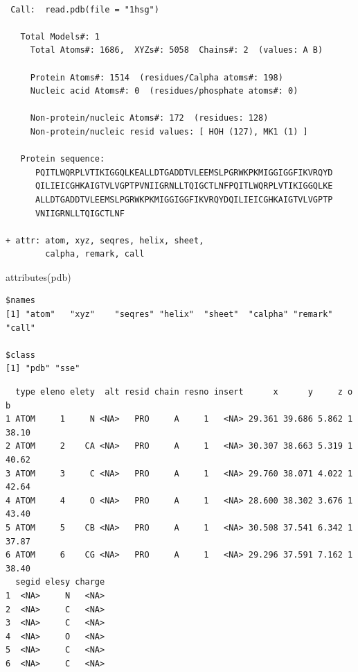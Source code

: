 \documentclass[
  letterpaper,
  DIV=11,
  numbers=noendperiod]{scrartcl}
\newenvironment{Shaded}{\begin{snugshade}}{\end{snugshade}}
\newcommand{\FunctionTok}[1]{\textcolor[rgb]{0.28,0.35,0.67}{#1}}
\newcommand{\NormalTok}[1]{\textcolor[rgb]{0.00,0.23,0.31}{#1}}
\newcommand{\SpecialCharTok}[1]{\textcolor[rgb]{0.37,0.37,0.37}{#1}}
\begin{document}
\begin{verbatim}

 Call:  read.pdb(file = "1hsg")

   Total Models#: 1
     Total Atoms#: 1686,  XYZs#: 5058  Chains#: 2  (values: A B)

     Protein Atoms#: 1514  (residues/Calpha atoms#: 198)
     Nucleic acid Atoms#: 0  (residues/phosphate atoms#: 0)

     Non-protein/nucleic Atoms#: 172  (residues: 128)
     Non-protein/nucleic resid values: [ HOH (127), MK1 (1) ]

   Protein sequence:
      PQITLWQRPLVTIKIGGQLKEALLDTGADDTVLEEMSLPGRWKPKMIGGIGGFIKVRQYD
      QILIEICGHKAIGTVLVGPTPVNIIGRNLLTQIGCTLNFPQITLWQRPLVTIKIGGQLKE
      ALLDTGADDTVLEEMSLPGRWKPKMIGGIGGFIKVRQYDQILIEICGHKAIGTVLVGPTP
      VNIIGRNLLTQIGCTLNF

+ attr: atom, xyz, seqres, helix, sheet,
        calpha, remark, call
\end{verbatim}

\begin{Shaded}
\begin{Highlighting}[]
\FunctionTok{attributes}\NormalTok{(pdb)}
\end{Highlighting}
\end{Shaded}

\begin{verbatim}
$names
[1] "atom"   "xyz"    "seqres" "helix"  "sheet"  "calpha" "remark" "call"  

$class
[1] "pdb" "sse"
\end{verbatim}

\begin{Shaded}
\end{Shaded}

\begin{verbatim}
  type eleno elety  alt resid chain resno insert      x      y     z o     b
1 ATOM     1     N <NA>   PRO     A     1   <NA> 29.361 39.686 5.862 1 38.10
2 ATOM     2    CA <NA>   PRO     A     1   <NA> 30.307 38.663 5.319 1 40.62
3 ATOM     3     C <NA>   PRO     A     1   <NA> 29.760 38.071 4.022 1 42.64
4 ATOM     4     O <NA>   PRO     A     1   <NA> 28.600 38.302 3.676 1 43.40
5 ATOM     5    CB <NA>   PRO     A     1   <NA> 30.508 37.541 6.342 1 37.87
6 ATOM     6    CG <NA>   PRO     A     1   <NA> 29.296 37.591 7.162 1 38.40
  segid elesy charge
1  <NA>     N   <NA>
2  <NA>     C   <NA>
3  <NA>     C   <NA>
4  <NA>     O   <NA>
5  <NA>     C   <NA>
6  <NA>     C   <NA>
\end{verbatim}
\end{document}
